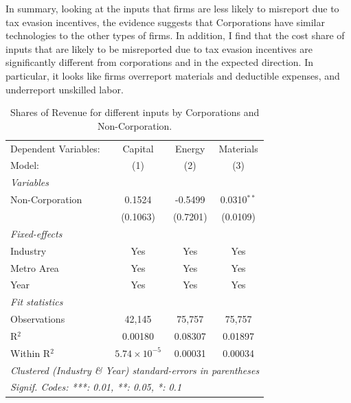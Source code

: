 \documentclass[
  12pt]{article}
\begin{document}
In summary, looking at the inputs that firms are less likely to
misreport due to tax evasion incentives, the evidence suggests that
Corporations have similar technologies to the other types of firms. In
addition, I find that the cost share of inputs that are likely to be
misreported due to tax evasion incentives are significantly different
from corporations and in the expected direction. In particular, it looks
like firms overreport materials and deductible expenses, and underreport
unskilled labor.

\begin{table}

\caption{\label{tbl-reg-shares}Shares of Revenue for different inputs by
Corporations and Non-Corporation.}

\begin{minipage}{\linewidth}

\begingroup
\centering
\begin{tabular}{lccc}
   \tabularnewline \midrule \midrule
   Dependent Variables: & Capital               & Energy   & Materials\\  
   Model:               & (1)                   & (2)      & (3)\\  
   \midrule
   \emph{Variables}\\
   Non-Corporation      & 0.1524                & -0.5499  & 0.0310$^{**}$\\   
                        & (0.1063)              & (0.7201) & (0.0109)\\   
   \midrule
   \emph{Fixed-effects}\\
   Industry             & Yes                   & Yes      & Yes\\  
   Metro Area           & Yes                   & Yes      & Yes\\  
   Year                 & Yes                   & Yes      & Yes\\  
   \midrule
   \emph{Fit statistics}\\
   Observations         & 42,145                & 75,757   & 75,757\\  
   R$^2$                & 0.00180               & 0.08307  & 0.01897\\  
   Within R$^2$         & $5.74\times 10^{-5}$  & 0.00031  & 0.00034\\  
   \midrule \midrule
   \multicolumn{4}{l}{\emph{Clustered (Industry \& Year) standard-errors in parentheses}}\\
   \multicolumn{4}{l}{\emph{Signif. Codes: ***: 0.01, **: 0.05, *: 0.1}}\\
\end{tabular}
\par\endgroup

\end{minipage}%

\end{table}%
\end{document}
